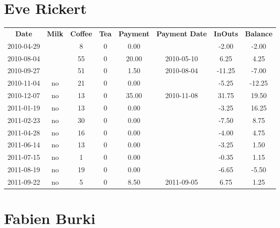 \section{Eve Rickert}

\begin{center}
\begin{tabular}{cccccccc}
\textbf{Date} & \textbf{Milk} & \textbf{Coffee} & \textbf{Tea} & \textbf{Payment} & \textbf{Payment Date} & \textbf{InOuts} & \textbf{Balance} \\
2010-04-29 &  &  8 & 0 &  0.00 &  &  -2.00 &  -2.00\\ 
2010-08-04 &  & 55 & 0 & 20.00 & 2010-05-10 &   6.25 &   4.25\\ 
2010-09-27 &  & 51 & 0 &  1.50 & 2010-08-04 & -11.25 &  -7.00\\ 
2010-11-04 & no & 21 & 0 &  0.00 &  &  -5.25 & -12.25\\ 
2010-12-07 & no & 13 & 0 & 35.00 & 2010-11-08 &  31.75 &  19.50\\ 
2011-01-19 & no & 13 & 0 &  0.00 &  &  -3.25 &  16.25\\ 
2011-02-23 & no & 30 & 0 &  0.00 &  &  -7.50 &   8.75\\ 
2011-04-28 & no & 16 & 0 &  0.00 &  &  -4.00 &   4.75\\ 
2011-06-14 & no & 13 & 0 &  0.00 &  &  -3.25 &   1.50\\ 
2011-07-15 & no &  1 & 0 &  0.00 &  &  -0.35 &   1.15\\ 
2011-08-19 & no & 19 & 0 &  0.00 &  &  -6.65 &  -5.50\\ 
2011-09-22 & no &  5 & 0 &  8.50 & 2011-09-05 &   6.75 &   1.25
\end{tabular}
\end{center}

\section{Fabien Burki}

